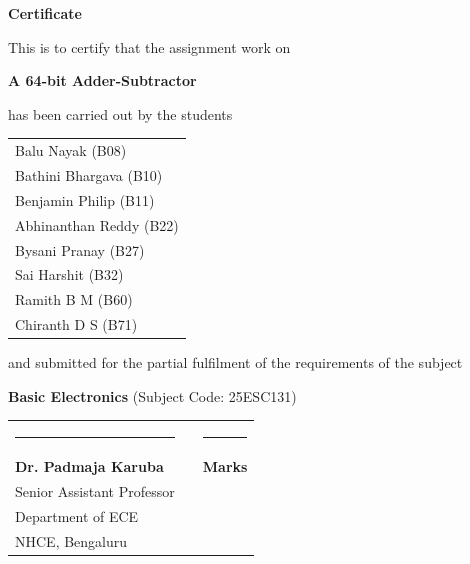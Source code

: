 \documentclass[a4paper]{article}
\begin{document}
 \newpage
 \begin{center}
  {\Huge \bf Certificate \bigbreak}

   \vspace{8em}

   {\Large This is to certify that the assignment work on \bigbreak}

   \vspace{2em}

   {\Huge \bf A 64-bit Adder-Subtractor \bigbreak}

   \vspace{2em}
   
   {\Large has been carried out by the students \bigbreak}

   \vspace{2em}
   
   {\Large \bf
     \begin{tabular}{l}
       Balu Nayak (B08) \\
       Bathini Bhargava (B10) \\
       Benjamin Philip (B11) \\
       Abhinanthan Reddy (B22) \\
       Bysani Pranay (B27) \\
       Sai Harshit (B32) \\
       Ramith B M (B60) \\
       Chiranth D S (B71)
     \end{tabular}
   }

   \vspace{2em}

   {\Large and submitted for the partial fulfilment of the requirements of the subject \bigbreak}

   \vspace{2em}

   {\Large \textbf{Basic Electronics} \smallbreak}
   {\Large  (Subject Code: 25ESC131) \bigbreak}

   \vspace{8em}

 \end{center}

 \begin{tabular}{@{}p{}p{}p{}@{}}
   \rule{4cm}{0.4pt} & & \rule{1.5cm}{0.4pt} \\
   \textbf{Dr. Padmaja Karuba} & & \textbf{Marks} \\
   Senior Assistant Professor \\
   Department of ECE \\
   NHCE, Bengaluru
 \end{tabular}

 
\end{document}
